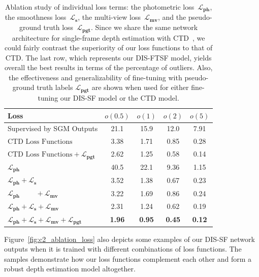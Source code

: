 \begin{table}[t]
    \begin{center}
        \begin{tabular}{lcccc}
        \hline
        Loss & $o(0.5)$ & $o(1)$ & $o(2)$ & $o(5)$\\
        \hline
        Supervised by SGM Outputs & 21.1 & 15.9 & 12.0 & 7.91\\
        $\text{CTD Loss Functions}$ & 3.38 & 1.71 & 0.85 & 0.28\\
        $\text{CTD Loss Functions} + \boldsymbol{\mathcal{L}_{pgt}}$ & 2.62 & 1.25 & 0.58 & 0.14\\        
        $\boldsymbol{\mathcal{L}_{ph}}$ & 40.5 & 22.1 & 9.36 & 1.15\\
        $\boldsymbol{\mathcal{L}_{ph}} + \boldsymbol{\mathcal{L}_s}$ & 3.52 & 1.38 & 0.67 & 0.23\\
        $\boldsymbol{\mathcal{L}_{ph}} \phantom{IILL} + \boldsymbol{\mathcal{L}_{mv}}$ & 3.22 & 1.69 & 0.86 & 0.24\\
        $\boldsymbol{\mathcal{L}_{ph}} + \boldsymbol{\mathcal{L}_s} + \boldsymbol{\mathcal{L}_{mv}}$ & 2.31 & 1.24 & 0.62 & 0.19\\
        $\boldsymbol{\mathcal{L}_{ph}} + \boldsymbol{\mathcal{L}_s} + \boldsymbol{\mathcal{L}_{mv}} + \boldsymbol{\mathcal{L}_{pgt}}$ & \textbf{1.96} & \textbf{0.95} & \textbf{0.45} & \textbf{0.12}\\
        \hline
        \end{tabular}
    \end{center}
    \caption{Ablation study of individual loss terms: the photometric loss~$\boldsymbol{\mathcal{L}_{ph}}$, the smoothness loss~$\boldsymbol{\mathcal{L}_{s}}$, the multi-view loss~$\boldsymbol{\mathcal{L}_{mv}}$, and the pseudo-ground truth loss~$\boldsymbol{\mathcal{L}_{pgt}}$. Since we share the same network architecture for single-frame depth estimation with CTD~\citep{riegler2019connecting},  we could fairly contrast the superiority of our loss functions to that of CTD. The last row, which represents our DIS-FTSF model, yields overall the best results in terms of the percentage of outliers. Also, the effectiveness and generalizability of fine-tuning with pseudo-ground truth labels $\boldsymbol{\mathcal{L}_{pgt}}$ are shown when used for either fine-tuning our DIS-SF model or the CTD model.}
    \label{table:ablation_dis_sf_loss}
\end{table}

Figure~\ref{fig:c2_ablation_loss} also depicts some examples of our DIS-SF network outputs when it is trained with different combinations of loss functions. The samples demonstrate how our loss functions complement each other and form a robust depth estimation model altogether.

